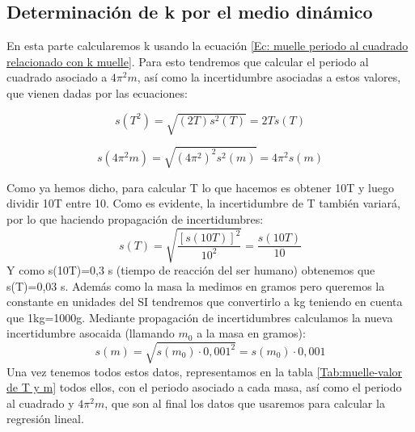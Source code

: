 \documentclass[12pt,a4paper]{book}
\begin{document}
\subsection{Determinación de k por el medio dinámico}
En esta parte calcularemos k usando la ecuación \ref{Ec: muelle periodo al cuadrado relacionado con k muelle}. Para esto tendremos que calcular el periodo al cuadrado asociado a $4 \pi^2 m$, así como la incertidumbre asociadas a estos valores, que vienen dadas por las ecuaciones: 

\begin{equation}
s(T^2)=\sqrt{(2T)s^2(T)}=2Ts(T)
\label{Ec: muelle incertidumbre del periodo muelle}
\end{equation}

\begin{equation}
s(4\pi^2m)=\sqrt{(4\pi^2)^2s^2(m)}=4 \pi^2 s(m)
\label{Ec: muelle incertidumbre de 4pim muelle}
\end{equation}

Como ya hemos dicho, para calcular T lo que hacemos es obtener 10T y luego dividir 10T entre 10. Como es evidente, la incertidumbre de T también variará, por lo que haciendo propagación de incertidumbres:
\begin{equation}
s(T)=\sqrt{\dfrac{[s(10T)]^2}{10^2}}=\dfrac{s(10T)}{10}
\end{equation}
Y como s(10T)=0,3 s (tiempo de reacción del ser humano) obtenemos que s(T)=0,03 s. Además como la masa la medimos en gramos pero queremos la constante en unidades del SI tendremos que convertirlo a kg teniendo en cuenta que 1kg=1000g. Mediante propagación de incertidumbres calculamos la nueva incertidumbre asocaida (llamando $m_0$ a la masa en gramos):
\begin{equation}
s(m)=\sqrt{s(m_0)\cdot 0,001^2}=s(m_0)\cdot 0,001
\end{equation}
Una vez tenemos todos estos datos, representamos en la tabla \ref{Tab:muelle-valor de T y m} todos ellos, con el periodo asociado a cada masa, así como el periodo al cuadrado y $4 \pi^2 m$, que son al final los datos que usaremos para calcular la regresión lineal. \\
\end{document}
